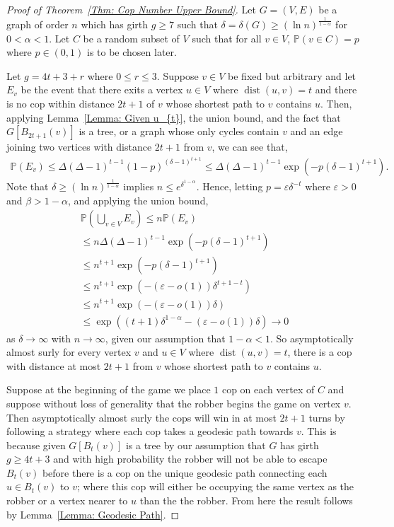 \documentclass{amsart}
\DeclareMathOperator{\dist}{dist}
\DeclareMathOperator{\exponential}{exp}
\theoremstyle{definition}
\def\epsilon{\varepsilon}
\begin{document}
\begin{proof}[Proof of Theorem~\ref{Thm: Cop Number Upper Bound}]
Let $G = (V,E)$ be a graph of order $n$ which has girth $g \geq 7$ such that $\delta = \delta(G) \geq (\ln{n})^{\frac{1}{1-\alpha}}$ for $0 < \alpha < 1$. Let $C$ be a random subset of $V$ such that for all $v \in V$, $\mathbb{P}(v \in C) = p$ where $p \in (0,1)$ is to be chosen later. 

Let $g = 4t+3 + r$ where $0 \leq r \leq 3$. Suppose $v \in V$ be fixed but arbitrary and let $E_v$ be the event that there exits a vertex $u \in V$ where  $\dist(u,v) = t$ and there is no cop within distance $2t+1$ of $v$ whose shortest path to $v$ contains $u$. Then, applying Lemma~\ref{Lemma: Given u_{t}}, the union bound, and the fact that $G[B_{2t+1}(v)]$ is a tree, or a graph whose only cycles contain $v$ and an edge joining two vertices with distance $2t+1$ from $v$, we can see that,
\begin{align*} 
\mathbb{P}(E_v) \leq \Delta(\Delta-1)^{t-1} (1-p)^{(\delta-1)^{t+1}} \leq \Delta(\Delta-1)^{t-1} \exponential(-p(\delta-1)^{t+1}).
\end{align*}
Note that $\delta \geq (\ln{n})^{\frac{1}{1-\alpha}}$ implies $n \leq e^{\delta^{1-\alpha}}$. Hence, letting $p = \epsilon \delta^{-t}$ where $\epsilon>0$ and $\beta >1- \alpha$, and applying the union bound,
\begin{align*} 
\mathbb{P}(\bigcup_{v\in V}E_v) \leq n \mathbb{P}(E_v) \\
 \leq n\Delta(\Delta-1)^{t-1} \exponential(-p(\delta-1)^{t+1}) \\
\leq n^{t+1} \exponential(-p(\delta-1)^{t+1}) \\
\leq n^{t+1} \exponential(-(\epsilon-o(1))\delta^{t+1  - t})\\
\leq  n^{t+1} \exponential(-(\epsilon-o(1)) \delta) \\
\leq \exponential((t+1)\delta^{1-\alpha}-(\epsilon-o(1)) \delta) \rightarrow 0
\end{align*}
as $\delta \rightarrow \infty$ with $n \rightarrow \infty$, given our assumption that $1- \alpha< 1$. So asymptotically almost surly for every vertex $v$ and $u \in V$ where $\dist(u,v) = t$, there is a cop with distance at most $2t+1$ from $v$ whose shortest path to  $v$ contains $u$. 

Suppose at the beginning of the game we place $1$ cop on each vertex of $C$ and suppose without loss of generality that the robber begins the game on vertex $v$. Then asymptotically almost surly the cops will win in at most $2t+1$ turns by following a strategy where each cop takes a geodesic path towards $v$. This is because given $G[B_t(v)]$ is a tree by our assumption that $G$ has girth $g \geq 4t+3$ and with high probability the robber will not be able to escape $B_t(v)$ before there is a cop on the unique geodesic path connecting  each $u \in B_t(v)$ to $v$; where this cop will either be occupying the same vertex as the robber or a vertex nearer to $u$ than the the robber. From here the result follows by Lemma~\ref{Lemma: Geodesic Path}.


\end{proof}
\end{document}
